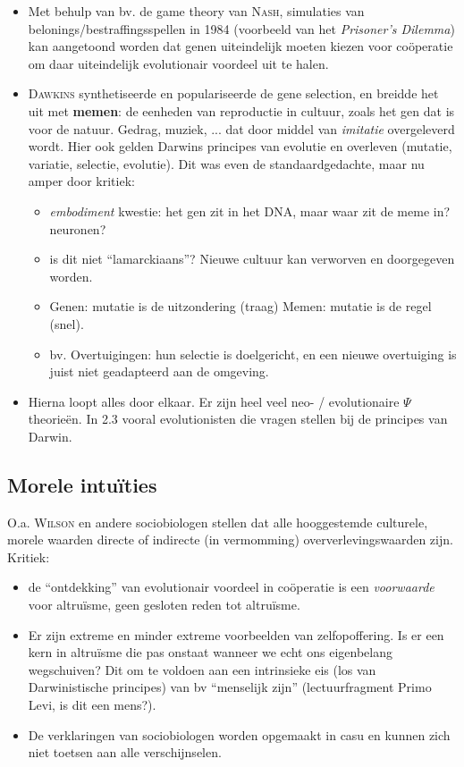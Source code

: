 \documentclass[11pt,a4paper]{article}
\begin{document}
\begin{itemize}

\item Met behulp van bv. de game theory van \textsc{Nash}, simulaties van belonings/bestraffingsspellen in 1984 (voorbeeld van het \emph{Prisoner's Dilemma}) kan aangetoond worden dat genen uiteindelijk moeten kiezen voor co\"operatie om daar uiteindelijk evolutionair voordeel uit te halen.

\item \textsc{Dawkins} synthetiseerde en populariseerde de gene selection, en breidde het uit met \textbf{memen}: de eenheden van reproductie in cultuur, zoals het gen dat is voor de natuur. Gedrag, muziek, ... dat door middel van \emph{imitatie} overgeleverd wordt. Hier ook gelden Darwins principes van evolutie en overleven (mutatie, variatie, selectie, evolutie). Dit was even de standaardgedachte, maar nu amper door kritiek:
	\begin{itemize}
	\item \emph{embodiment} kwestie: het gen zit in het DNA, maar waar zit de meme in? neuronen?
	\item is dit niet ``lamarckiaans''? Nieuwe cultuur kan verworven en doorgegeven worden.
	\item Genen: mutatie is de uitzondering (traag) Memen: mutatie is de regel (snel).
	\item bv. Overtuigingen: hun selectie is doelgericht, en een nieuwe overtuiging is juist niet geadapteerd aan de omgeving.
	\end{itemize}
\item Hierna loopt alles door elkaar. Er zijn heel veel neo- / evolutionaire $\Psi$ theorie\"en. In 2.3 vooral evolutionisten die vragen stellen bij de principes van Darwin.
\end{itemize}


\subsection{Morele intu\"ities}
O.a. \textsc{Wilson} en andere sociobiologen stellen dat alle hooggestemde culturele, morele waarden directe of indirecte (in vermomming) oververlevingswaarden zijn. Kritiek:
\begin{itemize}
\item de ``ontdekking'' van evolutionair voordeel in co\"operatie is een \emph{voorwaarde} voor altru\"isme, geen gesloten reden tot altru\"isme.
\item Er zijn extreme en minder extreme voorbeelden van zelfopoffering. Is er een kern in altru\"isme die pas onstaat wanneer we echt ons eigenbelang wegschuiven? Dit om te voldoen aan een intrinsieke eis (los van Darwinistische principes) van bv ``menselijk zijn'' (lectuurfragment Primo Levi, is dit een mens?). 
\item De verklaringen van sociobiologen worden opgemaakt in casu en kunnen zich niet toetsen aan alle verschijnselen.
\end{itemize}
\end{document}
